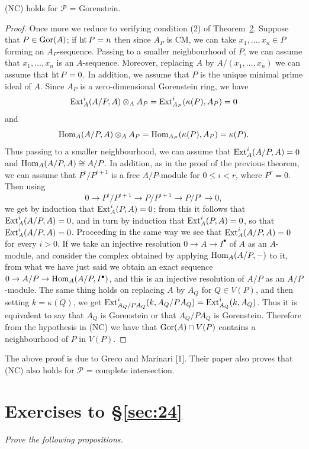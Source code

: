 \begin{theorem}\label{thm:24.6}
(NC) holds for $\mathcal{P}$ = Gorenstein.
\end{theorem}

\begin{proof}
Once more we reduce to verifying condition (2) of Theorem~\hyperref[thm:24.2]{2}. Suppose that
$P \in \operatorname{Gor}(A)$; if $\operatorname{ht} P = n$ then since $A_P$ is CM, we can take
$x_1, \ldots, x_n \in P$ forming an $A_P$-sequence. Passing to a smaller
neighbourhood of $P$, we can assume that $x_1, \ldots, x_n$ is an $A$-sequence.
Moreover, replacing $A$ by $A/(x_1, \ldots, x_n)$ we can assume that $\operatorname{ht} P = 0$. In
addition, we assume that $P$ is the unique minimal prime ideal of $A$. Since $A_P$
is a zero-dimensional Gorenstein ring, we have
\[
  \operatorname{Ext}^i_A(A/P, A) \otimes_A A_P = \operatorname{Ext}^i_{A_P}(\kappa(P), A_P) = 0
\]
and
\[
  \operatorname{Hom}_A(A/P, A) \otimes_A A_P = \operatorname{Hom}_{A_P}(\kappa(P), A_P) = \kappa(P).
\]
Thus passing to a smaller neighbourhood, we can assume that
$\operatorname{Ext}^i_A(A/P, A) = 0$ and $\operatorname{Hom}_A(A/P, A) \cong A/P$. In addition, as in the proof of
the previous theorem, we can assume that $P^i/P^{i+1}$ is a free $A/P$-module for
$0 \le i < r$, where $P^r = 0$. Then using
\[
  0 \to P^i/P^{i+1} \to P/P^{i+1} \to P/P^i \to 0,
\]
we get by induction that $\operatorname{Ext}^i_A(P, A) = 0$; from this it follows that
$\operatorname{Ext}^i_A(A/P, A) = 0$, and in turn by induction that $\operatorname{Ext}^i_A(P, A) = 0$, so that
$\operatorname{Ext}^i_A(A/P, A) = 0$. Proceeding in the same way we see that
$\operatorname{Ext}^i_A(A/P, A) = 0$ for every $i > 0$. If we take an injective resolution
$0 \to A \to I^{\bullet}$ of $A$ as an $A$-module, and consider the complex obtained by
applying $\operatorname{Hom}_A(A/P, -)$ to it, from what we have just said we obtain an exact
sequence $0 \to A/P \to \operatorname{Hom}_A(A/P, I^{\bullet})$, and this is an injective resolution of
$A/P$ as an $A/P$-module. The same thing holds on replacing $A$ by $A_Q$ for
$Q \in V(P)$, and then setting $k = \kappa(Q)$, we get
$\operatorname{Ext}^i_{A_Q/PA_Q}(k, A_Q/PA_Q) = \operatorname{Ext}^i_{A_Q}(k, A_Q)$. Thus it is equivalent to say that
$A_Q$ is Gorenstein or that $A_Q/PA_Q$ is Gorenstein. Therefore from the hypothesis
in (NC) we have that $\operatorname{Gor}(A) \cap V(P)$ contains a neighbourhood of $P$ in $V(P)$.
\end{proof}

The above proof is due to Greco and Marinari [1]. Their paper also proves that
(NC) also holds for $\mathcal{P}$ = complete intersection.

\section*{Exercises to \S\ref{sec:24}}
\emph{Prove the following propositions.}

